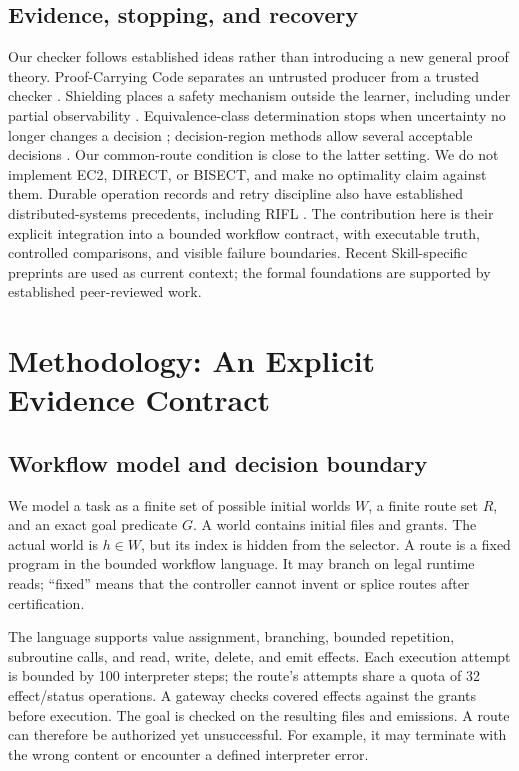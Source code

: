 \documentclass[conference]{IEEEtran}
\begin{document}
\subsection{Evidence, stopping, and recovery}
Our checker follows established ideas rather than introducing a new general proof theory. Proof-Carrying Code separates an untrusted producer from a trusted checker \cite{pcc}. Shielding places a safety mechanism outside the learner, including under partial observability \cite{shield,partialshield}. Equivalence-class determination stops when uncertainty no longer changes a decision \cite{ecd}; decision-region methods allow several acceptable decisions \cite{drd}. Our common-route condition is close to the latter setting. We do not implement EC2, DIRECT, or BISECT, and make no optimality claim against them. Durable operation records and retry discipline also have established distributed-systems precedents, including RIFL \cite{rifl}. The contribution here is their explicit integration into a bounded workflow contract, with executable truth, controlled comparisons, and visible failure boundaries. Recent Skill-specific preprints are used as current context; the formal foundations are supported by established peer-reviewed work.

\section{Methodology: An Explicit Evidence Contract}
\label{sec:method}
\subsection{Workflow model and decision boundary}
We model a task as a finite set of possible initial worlds $W$, a finite route set $R$, and an exact goal predicate $G$. A world contains initial files and grants. The actual world is $h\in W$, but its index is hidden from the selector. A route is a fixed program in the bounded workflow language. It may branch on legal runtime reads; ``fixed'' means that the controller cannot invent or splice routes after certification.

The language supports value assignment, branching, bounded repetition, subroutine calls, and read, write, delete, and emit effects. Each execution attempt is bounded by 100 interpreter steps; the route's attempts share a quota of 32 effect/status operations. A gateway checks covered effects against the grants before execution. The goal is checked on the resulting files and emissions. A route can therefore be authorized yet unsuccessful. For example, it may terminate with the wrong content or encounter a defined interpreter error.
\end{document}
